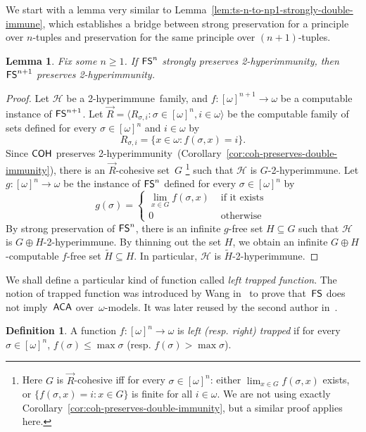 \documentclass{amsart}
\newtheorem{lemma}[theorem]{Lemma}
\theoremstyle{definition}
\newtheorem{definition}[theorem]{Definition}
\theoremstyle{remark}
\numberwithin{equation}{section}
\theoremstyle{noparens}
\def\propertyL{2-hyperimmunity}
\def\hyper{2-hyperimmune}
\def\v{\vec}
\newcommand{\Hcal}{\mathcal{H}}
\newcommand{\cond}[1]{\left\{\begin{array}{ll} #1 \end{array}\right.}
\newcommand{\s}[1]{\ensuremath{\sf{#1}}}
\DeclareMathOperator{\aca}{\s{ACA}}
\DeclareMathOperator{\coh}{\s{COH}}
\DeclareMathOperator{\fs}{\s{FS}}
\begin{document}
We start with a lemma very similar to Lemma~\ref{lem:ts-n-to-np1-strongly-double-immune},
which establishes a bridge between strong preservation for a principle over $n$-tuples
and preservation for the same principle over $(n+1)$-tuples.

\begin{lemma}\label{lem:fs-n-to-np1-strongly-double-immune}
Fix some $n \geq 1$.
If $\fs^n$ strongly preserves \propertyL, then $\fs^{n+1}$ preserves \propertyL.
\end{lemma}
\begin{proof}
Let $\Hcal$ be a  \hyper\ family, and $f : [\omega]^{n+1} \to \omega$ be a  computable
instance of $\fs^{n+1}$. Let $\vec{R} = \langle R_{\sigma,i} : \sigma \in [\omega]^n, i \in \omega \rangle$
be the  computable family of sets defined for every $\sigma \in [\omega]^n$ and $i \in \omega$ by
$$
R_{\sigma,i} = \{ x \in \omega : f(\sigma,x) = i \}.
$$
Since $\coh$ preserves \propertyL\ (Corollary~\ref{cor:coh-preserves-double-immunity}), there
is an $\vec{R}$-cohesive set~$G$
\footnote{Here $G$ is $\v R$-cohesive iff for every $\sigma\in [\omega]^n$:
either $\lim_{x\in G}f(\sigma,x)$ exists, or
$\{f(\sigma,x) = i:x\in G\}$ is finite for all $i\in\omega$.
We are not using exactly Corollary~\ref{cor:coh-preserves-double-immunity}, but a similar
proof applies here.} such that $\Hcal$ is $ G$-\hyper.
Let $g : [\omega]^n \to \omega$ be the instance of $\fs^n$ defined for every $\sigma \in [\omega]^n$ by
$$
g(\sigma) = \cond{
	\lim_{x \in G} f(\sigma, x) & \mbox{ if it exists }\\
	0 & \mbox{ otherwise } }
$$
By strong preservation of $\fs^n$, there is an infinite $g$-free set $H\subseteq G$
such that $\Hcal$ is $ G \oplus H$-\hyper.
By thinning out the set $H$, we obtain an infinite $G \oplus H$-computable $f$-free set $\tilde{H}\subseteq H$.
In particular, $\Hcal$ is $\tilde{H}$-\hyper.
\end{proof}

We shall define a particular kind of function called \emph{left trapped function}.
The notion of trapped function
was introduced by Wang in~\cite{Wang2014Some} to prove that~$\fs$ does not imply~$\aca$
over~$\omega$-models. It was later reused by the second author in~\cite{PateyCombinatorial,Patey2016weakness}.

\begin{definition}
A function $f : [\omega]^n \to \omega$ is \emph{left (resp. right) trapped}
if for every $\sigma \in [\omega]^n$, $f(\sigma) \leq \max\sigma$ (resp. $f(\sigma) >\max\sigma$).
\end{definition}
\end{document}
